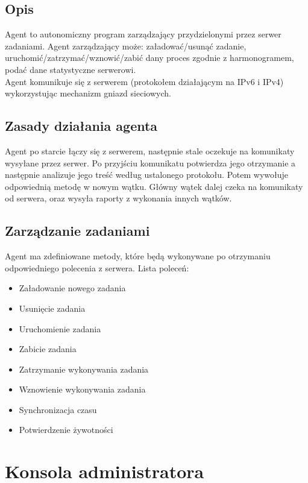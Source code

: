\documentclass[10pt,a4paper]{article}
\begin{document}
		\subsection{Opis}
			Agent to autonomiczny program zarządzający przydzielonymi przez serwer zadaniami. Agent zarządzający może: załadować/usunąć zadanie, uruchomić/zatrzymać/wznowić/zabić dany proces zgodnie z harmonogramem, podać dane statystyczne serwerowi. \\
			Agent komunikuje się z serwerem (protokołem działającym na IPv6 i IPv4) wykorzystując mechanizm gniazd sieciowych. \\
		
		\subsection{Zasady działania agenta}
			Agent po starcie łączy się z serwerem, następnie stale oczekuje na komunikaty wysyłane przez serwer. Po przyjściu komunikatu potwierdza jego otrzymanie a następnie analizuje jego treść według ustalonego protokołu. Potem wywołuje odpowiednią metodę w nowym wątku. Główny wątek dalej czeka na komunikaty od serwera, oraz wysyła raporty z wykonania innych wątków. \\
		
		\subsection{Zarządzanie zadaniami}
			Agent ma zdefiniowane metody, które będą wykonywane po otrzymaniu odpowiedniego polecenia z serwera. Lista poleceń: \\
			
			\begin{itemize}
				\item Załadowanie nowego zadania
				\item Usunięcie zadania
				\item Uruchomienie zadania
				\item Zabicie zadania
				\item Zatrzymanie wykonywania zadania
				\item Wznowienie wykonywania zadania
				\item Synchronizacja czasu
				\item Potwierdzenie żywotności 
			\end{itemize}

    
    
    \section{Konsola administratora}
\end{document}
